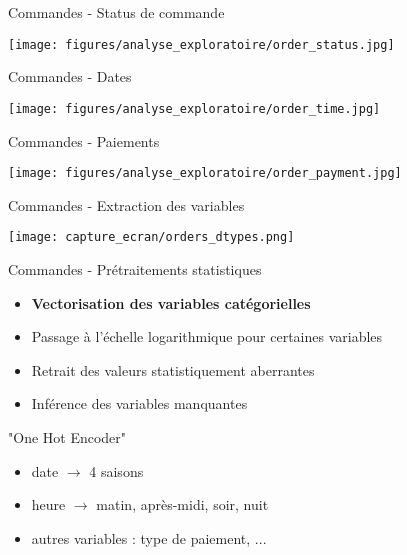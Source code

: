 \documentclass[10pt]{beamer}
\begin{document}
\begin{frame}{Commandes - Status de commande}
\begin{center}
   \texttt{[image: figures/analyse\_exploratoire/order\_status.jpg]}
\end{center}
\end{frame}
\begin{frame}{Commandes - Dates}
\begin{center}
   \texttt{[image: figures/analyse\_exploratoire/order\_time.jpg]}
\end{center}
\end{frame}
\begin{frame}{Commandes - Paiements}
\begin{center}
   \texttt{[image: figures/analyse\_exploratoire/order\_payment.jpg]}
\end{center}
\end{frame}
\begin{frame}{Commandes - Extraction des variables}
\begin{center}
   \texttt{[image: capture\_ecran/orders\_dtypes.png]}
\end{center}
\end{frame}
\begin{frame}{Commandes - Prétraitements statistiques}
    \begin{minipage}{0.52\linewidth}
        \begin{itemize}
            \item \textbf{Vectorisation des variables catégorielles }
            \item Passage à l'échelle logarithmique pour certaines variables
            \item Retrait des valeurs statistiquement aberrantes
            \item Inférence des variables manquantes
        \end{itemize}
    \end{minipage}
    \begin{minipage}{0.45\linewidth}
         "One Hot Encoder"
        \begin{itemize}
            \item date $\rightarrow$ 4 saisons
            \item heure $\rightarrow$ matin, après-midi, soir, nuit
            \item autres variables : type de paiement, ... 
        \end{itemize}
    \end{minipage}
\end{frame}
\end{document}
